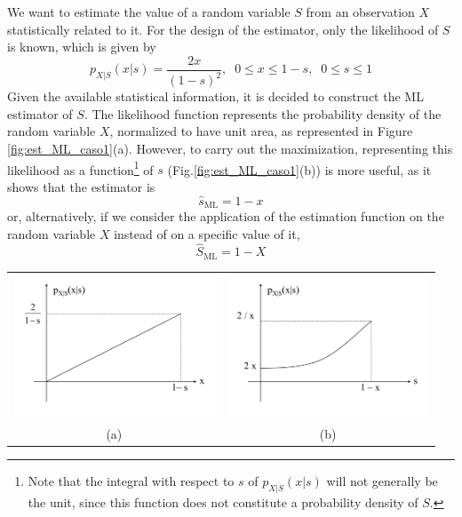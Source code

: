 \begin{example}[ML Estimation]
\label{ex:est_ML_varaleat}

We want to estimate the value of a random variable $S$ from an observation $X$ statistically related to it. For the design of the estimator, only the likelihood of $S$ is known, which is given by
\begin{equation}
p_{X|S}(x|s) = \frac{2 x}{(1 - s)^2},\;\; 0 \le x \le 1-s,\;\; 0 \le s \le 1
\end{equation}
Given the available statistical information, it is decided to construct the ML estimator of $S$. The likelihood function represents the probability density of the random variable $X$, normalized to have unit area, as represented in Figure \ref{fig:est_ML_caso1}(a). However, to carry out the maximization, representing this likelihood as a function\footnote{Note that the integral with respect to $s$ of $p_{X|S}(x|s)$ will not generally be the unit, since this function does not constitute a probability density of $S$.} of $s$ (Fig.\ref{fig:est_ML_caso1}(b)) is more useful, as it shows that the estimator is
$$\hat s_{\text{ML}} = 1 - x$$
or, alternatively, if we consider the application of the estimation function on the random variable $X$ instead of on a specific value of it,
$$\hat S_{\text{ML}} = 1 - X$$

\centering
\begin{tabular}{cc}
\includegraphics[width=6cm]{Figures/px_s_funcionx.png} &
\includegraphics[width=6cm]{Figures/px_s_funcions.png}\\
   (a) & (b)
\end{tabular}
\label{fig:est_ML_caso1}


\end{example}
